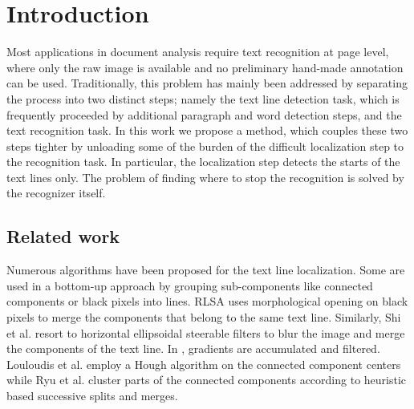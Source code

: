 \documentclass[conference]{IEEEtran}
\begin{document}




%
\IEEEpeerreviewmaketitle



\section{Introduction}

Most applications in document analysis require text recognition at page level, where only the raw image is available and no preliminary hand-made annotation can be used. Traditionally, this problem has mainly been addressed by separating the process into two distinct steps; namely the text line detection task, which is frequently proceeded by additional paragraph and word detection steps, and the text recognition task. In this work we propose a method, which couples these two steps tighter by unloading some of the burden of the difficult localization step to the recognition task. In particular, the localization step detects the starts of the text lines only. The problem of finding where to stop the recognition is solved by the recognizer itself.


\subsection{Related work}
Numerous algorithms have been proposed for the text line localization. Some are used in a bottom-up approach by grouping sub-components like connected components or black pixels into lines. RLSA \cite{wong1982document} uses morphological opening on black pixels to merge the components that belong to the same text line. Similarly, Shi et al. \cite{Shi2009a} resort to horizontal ellipsoidal steerable filters to blur the image and merge the components of the text line. In \cite{WolfICPR2002V}, gradients are accumulated and filtered. Louloudis et al. \cite{Louloudis2009b} employ a Hough algorithm on the connected component centers while Ryu et al. \cite{ryu2014language} cluster parts of the connected components according to heuristic based successive splits and merges.
\end{document}
